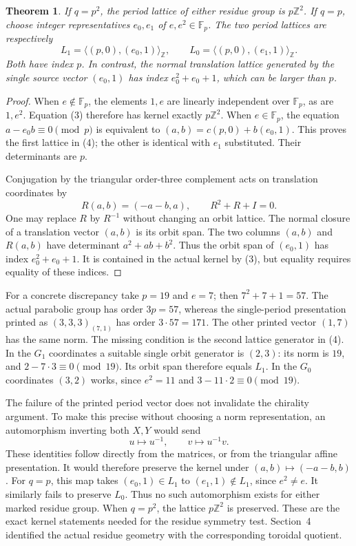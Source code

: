 \documentclass[11pt,a4paper]{article}
\newtheorem{theorem}{Theorem}
\newcommand{\gen}[1]{\langle #1\rangle}
\newcommand{\F}{\mathbb F}
\newcommand{\Z}{\mathbb Z}
\begin{document}
\begin{theorem}\label{periods}
If $q=p^2$, the period lattice of either residue group is
$p\Z^2$. If $q=p$, choose integer representatives $e_0,e_1$ of
$e,e^2\in\F_p$. The two period lattices are respectively
\[
 L_1=\gen{(p,0),(e_0,1)}_{\Z},\qquad
 L_0=\gen{(p,0),(e_1,1)}_{\Z}.                              \tag{4}
\]
Both have index $p$. In contrast, the normal translation lattice
generated by the single source vector $(e_0,1)$ has index
$e_0^2+e_0+1$, which can be larger than $p$.
\end{theorem}
\begin{proof}
When $e\notin\F_p$, the elements $1,e$ are linearly independent
over $\F_p$, as are $1,e^2$. Equation (3) therefore has kernel
exactly $p\Z^2$. When $e\in\F_p$, the equation
$a-e_0b\equiv0\pmod p$ is equivalent to
$(a,b)=c(p,0)+b(e_0,1)$. This proves the first lattice in (4);
the other is identical with $e_1$ substituted. Their determinants
are $p$.

Conjugation by the triangular order-three complement acts on
translation coordinates by
\[
                R(a,b)=(-a-b,a),\qquad R^2+R+I=0.
\]
One may replace $R$ by $R^{-1}$ without changing an orbit lattice.
The normal closure of a translation vector $(a,b)$ is its orbit
span. The two columns $(a,b)$ and $R(a,b)$ have determinant
$a^2+ab+b^2$. Thus the orbit span of $(e_0,1)$ has index
$e_0^2+e_0+1$. It is contained in the actual kernel by (3),
but equality requires equality of these indices.
\end{proof}

For a concrete discrepancy take $p=19$ and $e=7$; then
$7^2+7+1=57$. The actual parabolic group has order $3p=57$,
whereas the single-period presentation printed as $(3,3,3)_{(7,1)}$
has order $3\cdot57=171$. The other printed vector $(1,7)$ has
the same norm. The missing condition is the second lattice
generator in (4). In the $G_1$ coordinates a suitable single
orbit generator is $(2,3)$: its norm is $19$, and
$2-7\cdot3\equiv0\pmod{19}$. Its orbit span therefore equals
$L_1$. In the $G_0$ coordinates $(3,2)$ works, since $e^2=11$
and $3-11\cdot2\equiv0\pmod{19}$.

The failure of the printed period vector does not invalidate the
chirality argument. To make this precise without choosing a norm
representation, an automorphism inverting both $X,Y$ would send
\[
                        u\longmapsto u^{-1},\qquad
                        v\longmapsto u^{-1}v.
\]
These identities follow directly from the matrices, or from the
triangular affine presentation. It would therefore preserve the
kernel under $(a,b)\mapsto(-a-b,b)$. For $q=p$, this map takes
$(e_0,1)\in L_1$ to $(e_1,1)\notin L_1$, since $e^2\ne e$.
It similarly fails to preserve $L_0$. Thus no such automorphism
exists for either marked residue group. When $q=p^2$, the lattice
$p\Z^2$ is preserved. These are the exact kernel statements needed
for the residue symmetry test. Section~4 identified the actual
residue geometry with the corresponding toroidal quotient.
\end{document}
